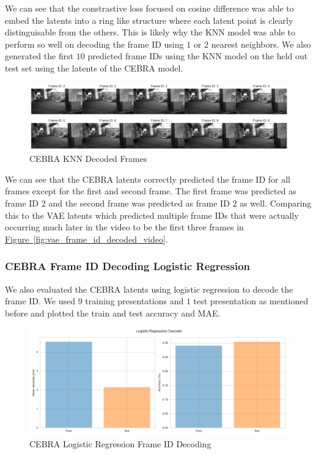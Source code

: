 \documentclass[12pt, letterpaper]{article}
\begin{document}
We can see that the constrastive loss focused on cosine difference was able to embed the latents into a ring like structure where each latent point is clearly distinguisable from the others. This is likely why the KNN model was able to perform so well on decoding the frame ID using $1$ or $2$ nearest neighbors. We also generated the first $10$ predicted frame IDs using the KNN model on the held out test set using the latents of the CEBRA \cite{schneider2023} model.

\begin{figure}[H]
    \centering
    \includegraphics[width=1.0\textwidth]{cebra_knn_video.png}
    \caption{CEBRA KNN Decoded Frames}
    \label{fig:cebra_knn_frame_id_decoded_video}
\end{figure}

We can see that the CEBRA \cite{schneider2023} latents correctly predicted the frame ID for all frames except for the first and second frame. The first frame was predicted as frame ID $2$ and the second frame was predicted as frame ID $2$ as well. Comparing this to the VAE latents which predicted multiple frame IDs that were actually occurring much later in the video to be the first three frames in \hyperref[fig:vae_frame_id_decoded_video]{Figure~\ref{fig:vae_frame_id_decoded_video}}. 

\subsubsection{CEBRA Frame ID Decoding Logistic Regression}
\label{subsubsec:cebra_frame_id_decoding_logistic}
We also evaluated the CEBRA \cite{schneider2023} latents using logistic regression to decode the frame ID. We used $9$ training presentations and $1$ test presentation as mentioned before and plotted the train and test accuracy and MAE.

\begin{figure}[H]
    \centering
    \includegraphics[width=.8\textwidth]{cebra_latents_lr_decoder.png}
    \caption{CEBRA Logistic Regression Frame ID Decoding}
    \label{fig:cebra_logistic_frame_id_accuracy_mae}
\end{figure}
\end{document}

